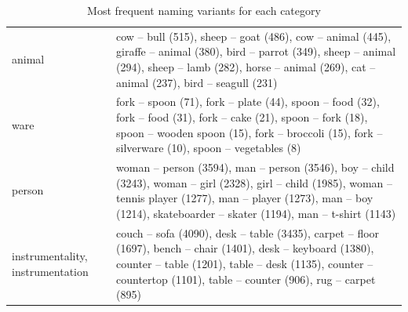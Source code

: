 \documentclass[11pt,a4paper]{article}
\begin{document}
\begin{table}
\begin{tabular}{lp{12cm}}
 animal &  cow -- bull (515), sheep -- goat (486), cow -- animal (445), giraffe -- animal (380), bird -- parrot (349), sheep -- animal (294), sheep -- lamb (282), horse -- animal (269), cat -- animal (237), bird -- seagull (231) \\
 ware &  fork -- spoon (71), fork -- plate (44), spoon -- food (32), fork -- food (31), fork -- cake (21), spoon -- fork (18), spoon -- wooden spoon (15), fork -- broccoli (15), fork -- silverware (10), spoon -- vegetables (8) \\
 person &  woman -- person (3594), man -- person (3546), boy -- child (3243), woman -- girl (2328), girl -- child (1985), woman -- tennis player (1277), man -- player (1273), man -- boy (1214), skateboarder -- skater (1194), man -- t-shirt (1143) \\
 instrumentality, instrumentation &  couch -- sofa (4090), desk -- table (3435), carpet -- floor (1697), bench -- chair (1401), desk -- keyboard (1380), counter -- table (1201), table -- desk (1135), counter -- countertop (1101), table -- counter (906), rug -- carpet (895) \\
\bottomrule
\end{tabular}\caption{Most frequent naming variants for each category}
\label{tab:exvariants}
\end{table}
\end{document}
